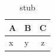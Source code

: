 \begin{table}[t]
\centering
\caption{stub}
\label{tab:hyperparameters}
\begin{tabular}{llc}
\toprule
A & B & C \\
\midrule
x & y & z \\
\bottomrule
\end{tabular}
\end{table}
